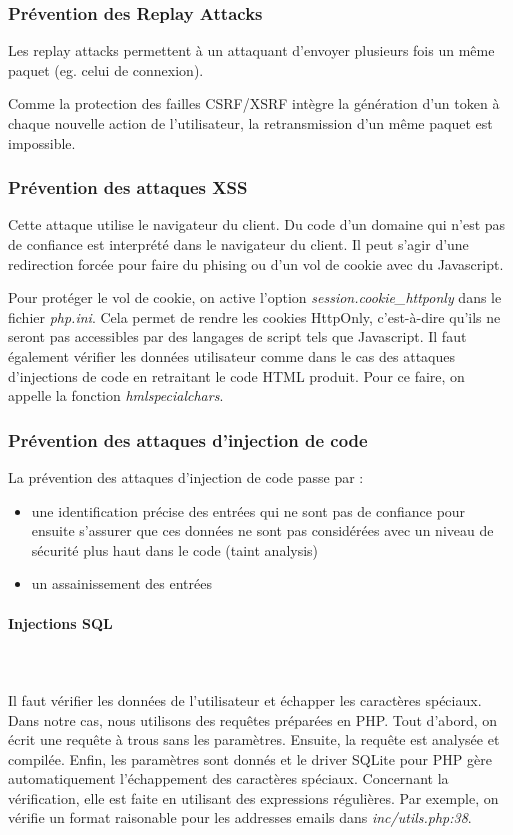 \documentclass[a4paper]{article}
\begin{document}
\subsubsection{Prévention des \og Replay Attacks \fg}
Les replay attacks permettent à un attaquant d'envoyer plusieurs fois un
même paquet (eg. celui de connexion).

Comme la protection des failles CSRF/XSRF intègre la génération d'un
token à chaque nouvelle action de l'utilisateur, la retransmission d'un
même paquet est impossible.

\subsubsection{Prévention des attaques XSS}
 		
Cette attaque utilise le navigateur du client. Du code d'un domaine qui
n'est pas de confiance est interprété dans le navigateur du client.
Il peut s'agir d'une redirection forcée pour faire  du phising
ou d'un vol de cookie avec du Javascript.

Pour protéger le vol de cookie, on active l'option \textit{session.cookie\_httponly}
dans le fichier \textit{php.ini}. Cela permet de rendre les cookies HttpOnly,
c'est-à-dire qu'ils ne seront pas accessibles par des langages de script
tels que Javascript. Il faut également vérifier les données utilisateur
comme dans le cas des attaques d'injections de code en retraitant le code
HTML produit. Pour ce faire, on appelle la fonction \textit{hmlspecialchars}.
 		
\subsubsection{Prévention des attaques d'injection de code}
La prévention des attaques d'injection de code passe par :
\begin{itemize}
	\item une identification précise des entrées qui ne sont pas de
		confiance pour ensuite s'assurer que ces données ne sont pas
		considérées avec un niveau de sécurité plus haut dans le code
		(taint analysis) 
	\item un assainissement des entrées
\end{itemize}
		
\paragraph{Injections SQL}
~~\\
\\
Il faut vérifier les données de l'utilisateur et échapper les caractères spéciaux.
Dans notre cas, nous utilisons des requêtes préparées en PHP.
Tout d'abord, on écrit une requête à trous sans les paramètres. Ensuite, la
requête est analysée et compilée. Enfin, les paramètres sont donnés et le driver
SQLite pour PHP gère automatiquement l'échappement des caractères spéciaux.
Concernant la vérification, elle est faite en utilisant des expressions régulières.			
Par exemple, on vérifie un format raisonable pour les addresses emails dans
\textit{inc/utils.php:38}.
\end{document}
